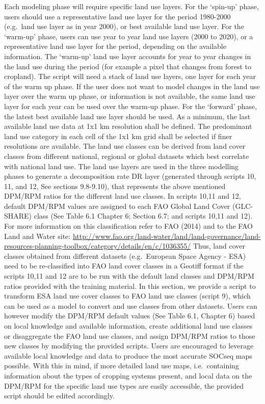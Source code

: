 \documentclass[
  10pt,
  b5paper,
]{book}
\begin{document}
Each modeling phase will require specific land use layers. For the `spin-up' phase, users should use a representative land use layer for the period 1980-2000 (e.g.~land use layer as in year 2000), or best available land use layer. For the `warm-up' phase, users can use year to year land use layers (2000 to 2020), or a representative land use layer for the period, depending on the available information. The `warm-up' land use layer accounts for year to year changes in the land use during the period (for example a pixel that changes from forest to cropland). The script will need a stack of land use layers, one layer for each year of the warm up phase. If the user does not want to model changes in the land use layer over the warm up phase, or information is not available, the same land use layer for each year can be used over the warm-up phase. For the `forward' phase, the latest best available land use layer should be used.
As a minimum, the last available land use data at 1x1 km resolution shall be defined. The predominant land use category in each cell of the 1x1 km grid shall be selected if finer resolutions are available.
The land use classes can be derived from land cover classes from different national, regional or global datasets which best correlate with national land use. The land use layers are used in the three modelling phases to generate a decomposition rate DR layer (generated through scripts 10, 11, and 12, See sections 9.8-9.10), that represents the above mentioned DPM/RPM ratios for the different land use classes. In scripts 10,11 and 12, default DPM/RPM values are assigned to each FAO Global Land Cover (GLC-SHARE) class (See Table 6.1 Chapter 6; Section 6.7; and scripts 10,11 and 12). For more information on this classification refer to FAO (2014) and to the FAO Land and Water site: \url{http://www.fao.org/land-water/land/land-governance/land-resources-planning-toolbox/category/details/en/c/1036355/}
Thus, land cover classes obtained from different datasets (e.g.~European Space Agency - ESA) need to be re-classified into FAO land cover classes in a Geotiff format if the scripts 10,11 and 12 are to be run with the default land classes and DPM/RPM ratios provided with the training material.
In this section, we provide a script to transform ESA land use cover classes to FAO land use classes (script 9), which can be used as a model to convert and use classes from other datasets. Users can however modify the DPM/RPM default values (See Table 6.1, Chapter 6) based on local knowledge and available information, create additional land use classes or disaggregate the FAO land use classes, and assign DPM/RPM ratios to those new classes by modifying the provided scripts. Users are encouraged to leverage available local knowledge and data to produce the most accurate SOCseq maps possible. With this in mind, if more detailed land use maps, i.e.~containing information about the types of cropping systems present, and local data on the DPM/RPM for the specific land use types are easily accessible, the provided script should be edited accordingly.\\
\end{document}
